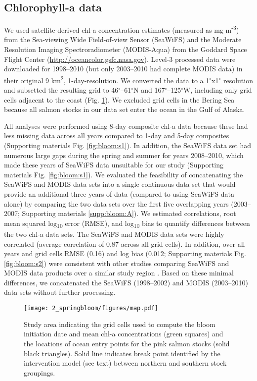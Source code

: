 \subsection{Chlorophyll-a data}

We used satellite-derived chl-a concentration estimates (measured as mg
m\textsuperscript{-3}) from the Sea-viewing Wide Field-of-view Sensor (SeaWiFS)
and the Moderate Resolution Imaging Spectroradiometer (MODIS-Aqua) from the
Goddard Space Flight Center (\url{http://oceancolor.gsfc.nasa.gov}). Level-3
processed data were downloaded for 1998--2010 (but only 2003--2010 had complete
MODIS data) in their original 9 km\textsuperscript{2}, 1-day-resolution. We
converted the data to a 1$^{\circ}$x1$^{\circ}$ resolution and subsetted the
resulting grid to 46$^{\circ}$--61$^{\circ}$N and 167$^{\circ}$--125$^{\circ}$W,
including only grid cells adjacent to the coast (Fig. \ref{fig:bloom:1}). We
excluded grid cells in the Bering Sea because all salmon stocks in our data set
enter the ocean in the Gulf of Alaska.

All analyses were performed using 8-day composite chl-a data because these had
less missing data across all years compared to 1-day and 5-day composites
(Supporting materials Fig. \ref{fig:bloom:s1}). In addition, the SeaWiFS data
set had numerous large gaps during the spring and summer for years 2008--2010,
which made these years of SeaWiFS data unsuitable for our study (Supporting
materials Fig. \ref{fig:bloom:s1}). We evaluated the feasibility of
concatenating the SeaWiFS and MODIS data sets into a single continuous data set
that would provide an additional three years of data (compared to using SeaWiFS
data alone) by comparing the two data sets over the first five overlapping years
(2003--2007; Supporting materials \ref{supp:bloom:A}). We estimated
correlations, root mean squared log\textsubscript{10} error (RMSE), and
log\textsubscript{10} bias to quantify differences between the two chl-a data
sets. The SeaWiFS and MODIS data sets were highly correlated (average
correlation of 0.87 across all grid cells). In addition, over all years and grid
cells RMSE (0.16) and log bias (0.012; Supporting materials Fig.
\ref{fig:bloom:s2}) were consistent with other studies comparing SeaWiFS and
MODIS data products over a similar study region \citep{Waite2013}. Based on
these minimal differences, we concatenated the SeaWiFS (1998--2002) and MODIS
(2003--2010) data sets without further processing.

\begin{figure}[htbp]
  \centering \texttt{[image: 2\_springbloom/figures/map.pdf]}
  \caption[Study area indicating chl-a grid cells and ocean entry locations for
           pink salmon stocks]{Study area indicating the grid cells used to
           compute the bloom initiation date and mean chl-a concentrations
           (green squares) and the locations of ocean entry points for the pink
           salmon stocks (solid black triangles). Solid line indicates break
           point identified by the intervention model (see text) between
           northern and southern stock groupings.}
  \label{fig:bloom:1}
\end{figure}

